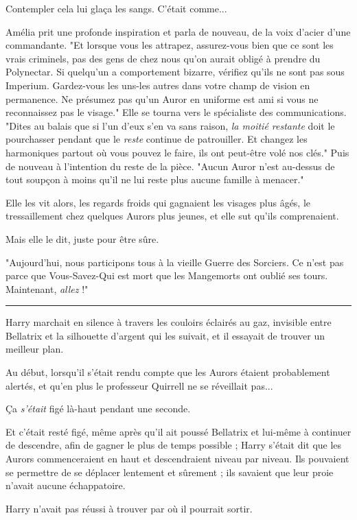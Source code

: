 Contempler cela lui glaça les sangs. C'était comme...

Amélia prit une profonde inspiration et parla de nouveau, de la voix d'acier d'une commandante. "Et lorsque vous les attrapez, assurez-vous bien que ce sont les vrais criminels, pas des gens de chez nous qu'on aurait obligé à prendre du Polynectar. Si quelqu'un a comportement bizarre, vérifiez qu'ils ne sont pas sous Imperium. Gardez-vous les uns-les autres dans votre champ de vision en permanence. Ne présumez pas qu'un Auror en uniforme est ami si vous ne reconnaissez pas le visage." Elle se tourna vers le spécialiste des communications. "Dites au balais que si l'un d'eux s'en va sans raison, \emph{la moitié restante}  doit le pourchasser pendant que le \emph{reste}  continue de patrouiller. Et changez les harmoniques partout où vous pouvez le faire, ils ont peut-être volé nos clés." Puis de nouveau à l'intention du reste de la pièce. "Aucun Auror n'est au-dessus de tout soupçon à moins qu'il ne lui reste plus aucune famille à menacer."

Elle les vit alors, les regards froids qui gagnaient les visages plus âgés, le tressaillement chez quelques Aurors plus jeunes, et elle sut qu'ils comprenaient.

Mais elle le dit, juste pour être sûre.

"Aujourd'hui, nous participons tous à la vieille Guerre des Sorciers. Ce n'est pas parce que Vous-Savez-Qui est mort que les Mangemorts ont oublié ses tours. Maintenant, \emph{allez}  !"
\par\noindent\rule{\textwidth}{0.4pt}
Harry marchait en silence à travers les couloirs éclairés au gaz, invisible entre Bellatrix et la silhouette d'argent qui les suivait, et il essayait de trouver un meilleur plan.

Au début, lorsqu'il s'était rendu compte que les Aurors étaient probablement alertés, et qu'en plus le professeur Quirrell ne se réveillait pas...

Ça \emph{s'était}  figé là-haut pendant une seconde.

Et c'était resté figé, même après qu'il ait poussé Bellatrix et lui-même à continuer de descendre, afin de gagner le plus de temps possible ; Harry s'était dit que les Aurors commenceraient en haut et descendraient niveau par niveau. Ils pouvaient se permettre de se déplacer lentement et sûrement ; ils savaient que leur proie n'avait aucune échappatoire.

Harry n'avait pas réussi à trouver par où il pourrait sortir.

